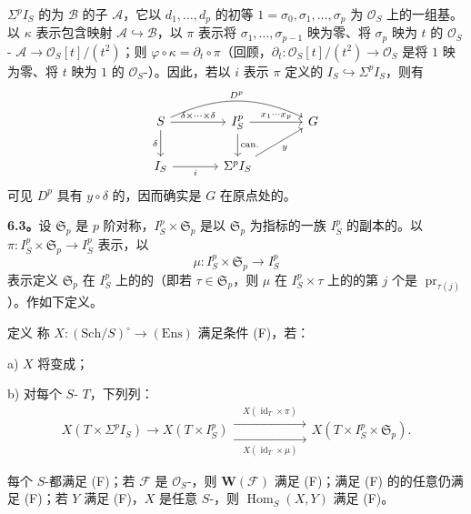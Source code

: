  $\Sigma^pI_S$ 的为 $\mathcal B$ 的子 $\mathcal A$，它以 $d_1,\ldots,d_p$ 的初等 $1=\sigma_0,\sigma_1,\ldots,\sigma_p$ 为 $\mathcal O_S$ 上的一组基。以 $\kappa$ 表示包含映射 $\mathcal A\hookrightarrow\mathcal B$，以 $\pi$ 表示将 $\sigma_1,\ldots,\sigma_{p-1}$ 映为零、将 $\sigma_p$ 映为 $t$ 的 $\mathcal O_S$- $\mathcal A\to\mathcal O_S[t]/(t^2)$；则 $\varphi\circ\kappa=\partial_t\circ\pi$（回顾，$\partial_t:\mathcal O_S[t]/(t^2)\to\mathcal O_S$ 是将 $1$ 映为零、将 $t$ 映为 $1$ 的 $\mathcal O_S$-）。因此，若以 $i$ 表示 $\pi$ 定义的 $I_S\hookrightarrow\Sigma^pI_S$，则有
\[
\begin{tikzcd}[column sep=large]
 S\arrow[r,"\delta\times\cdots\times\delta"]\arrow[d,"\delta"']\arrow[rr,bend left=25,"D^p"]
 &I_S^p\arrow[r,"x_1\cdots x_p"]\arrow[d,"\mathrm{can.}"]&G\\
 I_S\arrow[r,"i"']&\Sigma^pI_S\arrow[ur,"y"']
\end{tikzcd}
\]
可见 $D^p$ 具有 $y\circ\delta$ 的，因而确实是 $G$ 在原点处的。

\textbf{6.3。}设 $\mathfrak S_p$ 是 $p$ 阶对称，$I_S^p\times\mathfrak S_p$ 是以 $\mathfrak S_p$ 为指标的一族 $I_S^p$ 的副本的。以 $\pi:I_S^p\times\mathfrak S_p\to I_S^p$ 表示，以
\[
 \mu:I_S^p\times\mathfrak S_p\longrightarrow I_S^p
\]
表示定义 $\mathfrak S_p$ 在 $I_S^p$ 上的的（即若 $\tau\in\mathfrak S_p$，则 $\mu$ 在 $I_S^p\times\tau$ 上的的第 $j$ 个是 $\operatorname{pr}_{\tau(j)}$）。作如下定义。
\begin{SGAresult}{定义}{}
称 $X:(\mathrm{Sch}/S)^\circ\to(\mathrm{Ens})$ 满足条件 (F)，若：

 a) $X$ 将变成；

 b) 对每个 $S$- $T$，下列列：
\[
 X(T\times\Sigma^pI_S)\longrightarrow X(T\times I_S^p)
 \mathrel{\substack{\xrightarrow{\quad X(\operatorname{id}_T\times\pi)\quad}\\[-.6ex]
 \xrightarrow[\quad X(\operatorname{id}_T\times\mu)\quad]{}}}
 X(T\times I_S^p\times\mathfrak S_p).
\]
\end{SGAresult}
每个 $S$-都满足 (F)；若 $\mathcal F$ 是 $\mathcal O_S$-，则 $\mathbf W(\mathcal F)$ 满足 (F)；满足 (F) 的的任意仍满足 (F)；若 $Y$ 满足 (F)，$X$ 是任意 $S$-，则 $\operatorname{Hom}_S(X,Y)$ 满足 (F)。

